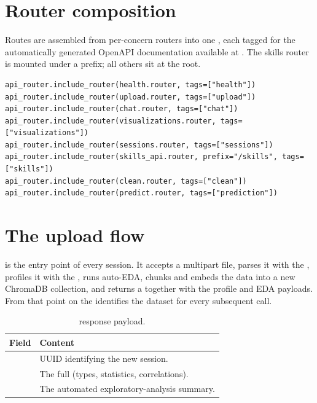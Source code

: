 \section{Router composition}
Routes are assembled from per-concern routers into one , each
tagged for the automatically generated OpenAPI documentation available at
. The skills router is mounted under a  prefix; all
others sit at the root.

\begin{lstlisting}[style=py,caption={Router composition (\code{app/api/router.py}).}]
api_router.include_router(health.router, tags=["health"])
api_router.include_router(upload.router, tags=["upload"])
api_router.include_router(chat.router, tags=["chat"])
api_router.include_router(visualizations.router, tags=["visualizations"])
api_router.include_router(sessions.router, tags=["sessions"])
api_router.include_router(skills_api.router, prefix="/skills", tags=["skills"])
api_router.include_router(clean.router, tags=["clean"])
api_router.include_router(predict.router, tags=["prediction"])
\end{lstlisting}

\section{The upload flow}
 is the entry point of every session. It accepts a
multipart file, parses it with the , profiles it with the
, runs auto-EDA, chunks and embeds the data into a new
ChromaDB collection, and returns a  together with the profile
and EDA payloads. From that point on the  identifies the
dataset for every subsequent call.

\begin{table}[h]
\centering
\caption{ response payload.}
\small
\begin{tabularx}{\linewidth}{@{}L{3.0cm} X@{}}
\toprule
\textbf{Field} & \textbf{Content} \\
\midrule
{} & UUID identifying the new session. \\
 & The full  (types, statistics, correlations). \\
 & The automated exploratory-analysis summary. \\
\bottomrule
\end{tabularx}
\end{table}


